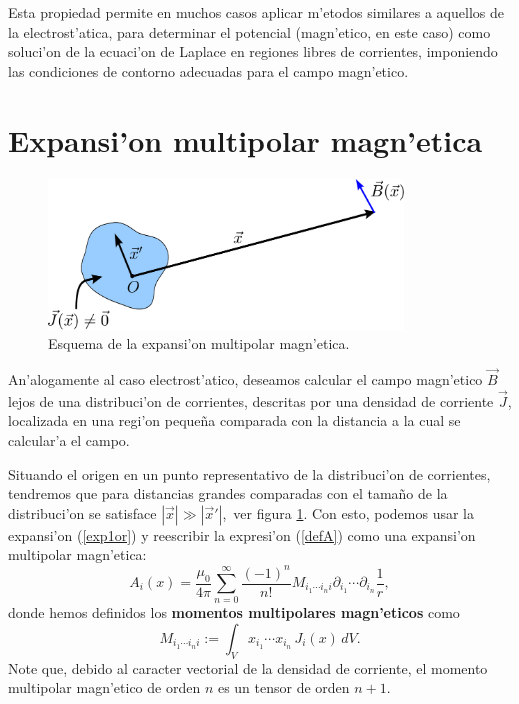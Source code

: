 Esta propiedad permite en muchos casos aplicar m'etodos similares a aquellos de
la electrost'atica, para determinar el potencial (magn'etico, en este caso)
como soluci'on de la ecuaci'on de Laplace en regiones libres de corrientes,
imponiendo las condiciones de contorno adecuadas para el campo magn'etico.

\section{Expansi'on multipolar magn'etica}\label{sec:emm}
\begin{figure}[!h]
\centerline{\includegraphics[height=4cm]{fig/fig-expansion-multipolar-magnetica-01.pdf}}
\caption{Esquema de la expansi'on multipolar magn'etica.}
\label{MM1}
\end{figure}
An'alogamente al caso electrost'atico, deseamos calcular el campo
magn'etico $\vec{B}$ lejos de una distribuci'on  de corrientes, descritas por una densidad de corriente $\vec{J}$, localizada en una regi'on peque\~na comparada con la distancia a la cual se calcular'a el campo.

Situando el origen en un punto representativo de la distribuci'on de
corrientes, tendremos que para distancias grandes comparadas con el
tama\~no de la distribuci'on se satisface $\left\vert\vec{x}\right\vert \gg\left\vert
\vec{x}'\right\vert $,\ ver figura \ref{MM1}. Con esto, podemos usar la
expansi'on (\ref{exp1or}) y reescribir la expresi'on (\ref{defA}) como una
expansi'on multipolar magn'etica:
\begin{equation}
 A_i(x)=\frac{\mu_0}{4\pi}\sum_{n=0}^\infty \frac{(-1)^n}{n!}M_{i_1\cdots
i_ni}\partial_{i_1}\cdots \partial_{i_n}\frac{1}{r},
\end{equation}
donde hemos definidos los \textbf{momentos multipolares magn'eticos} como
\begin{equation}
\boxed{ M_{i_1\cdots i_ni}:=\int_V x_{i_1}\cdots x_{i_n}\,J_i(x)\,dV.}
\end{equation}
Note que, debido al caracter vectorial de la densidad de corriente, el momento
multipolar magn'etico de orden $n$ es un tensor de orden $n+1$.

